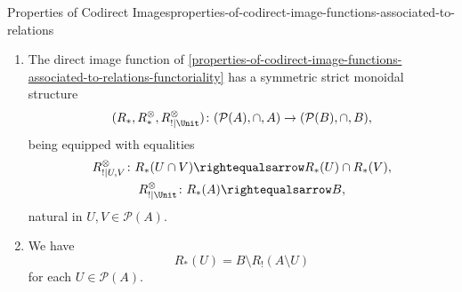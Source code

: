 \begin{proposition}{Properties of Codirect Images}{properties-of-codirect-image-functions-associated-to-relations}
\begin{enumerate}
\[\begin{gathered}
                    R^{\otimes}_{!|\Unit} \colon \emptyset               \subset R_{*}(\emptyset),
                \end{gathered}
            \]%
            natural in $U,V\in\mathcal{P}(A)$.
        \item\label{properties-of-codirect-image-functions-associated-to-relations-symmetric-strict-monoidality-with-respect-to-intersections}The direct image function of \cref{properties-of-codirect-image-functions-associated-to-relations-functoriality} has a symmetric strict monoidal structure
            \[
                (R_{*},R^{\otimes}_{*},R^{\otimes}_{!|\Unit})
                \colon
                (\mathcal{P}(A),\cap,A)
                \to
                (\mathcal{P}(B),\cap,B),
            \]%
            being equipped with equalities%
            \[
                \begin{gathered}
                    R^{\otimes}_{!|U,V}   \colon R_{*}(U\cap V) \rightequalsarrow R_{*}(U)\cap R_{*}(V),\\
                    R^{\otimes}_{!|\Unit} \colon R_{*}(A)       \rightequalsarrow B,
                \end{gathered}
            \]%
            natural in $U,V\in\mathcal{P}(A)$.
        \item\label{properties-of-codirect-image-functions-associated-to-relations-relation-to-direct-images}We have
            \[
                R_{*}(U)%
                =%
                B\setminus R_{!}(A\setminus U)
            \]%
            for each $U\in\mathcal{P}(A)$.
    \end{enumerate}
\end{proposition}
